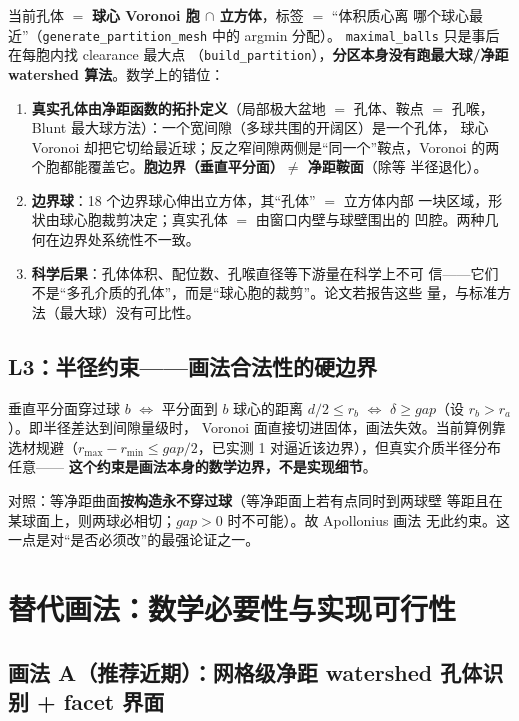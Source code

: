 \documentclass[11pt]{ctexart}
\begin{document}
当前孔体 $=$ \textbf{球心 Voronoi 胞 $\cap$ 立方体}，标签 $=$ ``体积质心离
哪个球心最近''（\texttt{generate\_partition\_mesh} 中的 argmin 分配）。
\texttt{maximal\_balls} 只是事后在每胞内找 clearance 最大点
（\texttt{build\_partition}），\textbf{分区本身没有跑最大球/净距 watershed
算法}。数学上的错位：
\begin{enumerate}
  \item \textbf{真实孔体由净距函数的拓扑定义}（局部极大盆地 $=$ 孔体、鞍点
  $=$ 孔喉，Blunt 最大球方法）：一个宽间隙（多球共围的开阔区）是一个孔体，
  球心 Voronoi 却把它切给最近球；反之窄间隙两侧是``同一个''鞍点，Voronoi
  的两个胞都能覆盖它。\textbf{胞边界（垂直平分面）$\neq$ 净距鞍面}（除等
  半径退化）。
  \item \textbf{边界球}：18 个边界球心伸出立方体，其``孔体'' $=$ 立方体内部
  一块区域，形状由球心胞裁剪决定；真实孔体 $=$ 由窗口内壁与球壁围出的
  凹腔。两种几何在边界处系统性不一致。
  \item \textbf{科学后果}：孔体体积、配位数、孔喉直径等下游量在科学上不可
  信——它们不是``多孔介质的孔体''，而是``球心胞的裁剪''。论文若报告这些
  量，与标准方法（最大球）没有可比性。
\end{enumerate}

\subsection{L3：半径约束——画法合法性的硬边界}

垂直平分面穿过球 $b$ $\iff$ 平分面到 $b$ 球心的距离 $d/2 \le r_b$
$\iff$ \textbf{$\delta \ge gap$}（设 $r_b > r_a$）。即半径差达到间隙量级时，
Voronoi 面直接切进固体，画法失效。当前算例靠选材规避（$r_{\max} -
r_{\min} \le gap/2$，已实测 1 对逼近该边界），但真实介质半径分布任意——
\textbf{这个约束是画法本身的数学边界，不是实现细节}。

对照：等净距曲面\textbf{按构造永不穿过球}（等净距面上若有点同时到两球壁
等距且在某球面上，则两球必相切；$gap>0$ 时不可能）。故 Apollonius 画法
无此约束。这一点是对``是否必须改''的最强论证之一。

\section{替代画法：数学必要性与实现可行性}

\subsection{画法 A（推荐近期）：网格级净距 watershed 孔体识别 + facet 界面}
\end{document}
